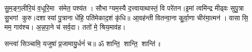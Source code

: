 
सु॒म॒ङ्ग॒लीरि॒यं व॒धूरि॒मा स॑मेत॒ पश्य॑त । सौभाग्यम॒स्यै द॒त्त्वायाथास्तं॒ वि परे॑तन।इ॒मां त्वमि॑न्द्र मीढ्वः सुपु॒त्रा सु॒भगां कुरु।दशास्यां पु॒त्राना धे॑हि॒ पति॑मेकाद॒शं कृ॑धि॥ आ॒वह॑न्ती वितन्वा॒ना कु॒र्वा॒णा चीर॑मा॒त्मन॑। वासासि॒ मम॒ गाव॑श्च। अ॒न्न॒पा॒ने च॑ सर्व॒दा। ततो॑ मे॒ श्रिय॒माव॑ह।

सन्त्वा॑ सिञ्चामि॒ यजुषा॑ प्र॒जामायु॒र्धनं॑ च॥ ॐ शान्ति॒ शान्ति॒ शान्ति॑॥
\closesection